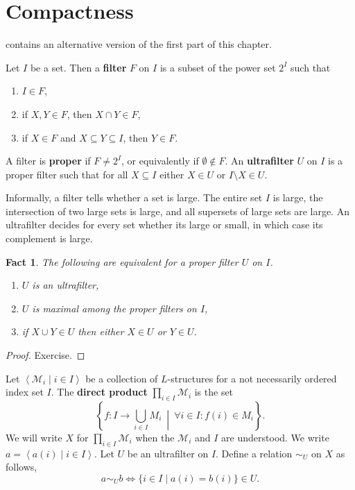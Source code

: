 \documentclass{article}
\newtheorem{nfact}[nthm]{Fact}
\newcommand{\named}[1]{\textbf{#1}\index{#1}}
\begin{document}
\clearpage
\section{Compactness}

 contains an alternative version of the first part of this chapter.

\begin{ndef}[Filter] \label{def:5.1}
Let $I$ be a set. Then a \named{filter} $F$ on $I$ is a subset of the power set $2^I$ such that
\begin{enumerate}[label=(\roman*)]
\item $I \in F$,
\item if $X, Y \in F$, then $X \cap Y \in F$,
\item if $X \in F$ and $X \subseteq Y \subseteq I$, then $Y \in F$.
\end{enumerate}
A filter is \named{proper} if $F \neq 2^I$, or equivalently if $\emptyset \not\in F$.
An \named{ultrafilter} $U$ on $I$ is a proper filter such that for all $X \subseteq I$ either $X \in U$ or $I \setminus X \in U$.
\end{ndef}
\begin{remark}
Informally, a filter tells whether a set is large. The entire set $I$ is large, the intersection of two large sets is large, and all supersets of large sets are large. An ultrafilter decides for every set whether its large or small, in which case its complement is large.
\end{remark}

\begin{nfact}\label{fact:5.2}
The following are equivalent for a proper filter $U$ on $I$.
\begin{enumerate}[label=(\roman*)]
\item $U$ is an ultrafilter,
\item $U$ is maximal among the proper filters on $I$,
\item if $X \cup Y \in U$ then either $X \in U$ or $Y \in U$.
\end{enumerate}
\end{nfact}
\begin{proof}
Exercise.
\end{proof}
\begin{ndef} \label{def:5.3}
Let $\left< \mathcal{M}_i \mid i \in I \right>$ be a collection of $L$-structures for a not necessarily ordered index set $I$. The \named{direct product} $\prod_{i \in I} \mathcal{M}_i$ is the set
\[
\left\{ f: I \to \bigcup_{i \in I} M_i \ \middle|\ \forall i \in I : f(i) \in M_i \right\}.
\]
We will write $X$ for $\prod_{i \in I} \mathcal{M}_i$ when the $\mathcal{M}_i$ and $I$ are understood. We write $a = \left< a(i) \mid i \in I \right>$. Let $U$ be an ultrafilter on $I$. Define a relation $\sim_U$ on $X$ as follows,
\[
a \sim_U b \iff \{i \in I \mid a(i) = b(i)\} \in U.
\]
\end{ndef}
\end{document}
